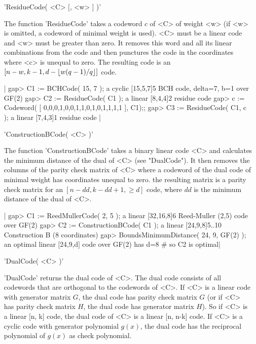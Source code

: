 
'ResidueCode( <C> [, <w> ] )'

The function 'ResidueCode' takes a codeword $c$  of <C> of weight <w> (if
<w> is  omitted, a codeword  of minimal weight is  used).  <C> must  be a
linear code and <w>  must be greater than zero.  It removes this word and
all its linear combinations from the code and then  punctures the code in
the coordinates where <c> is unequal  to zero.  The  resulting code is an
$[n-w, k-1, d-\lfloor w\*(q-1)/q \rfloor ]$ code.

|    gap> C1 := BCHCode( 15, 7 );
    a cyclic [15,5,7]5 BCH code, delta=7, b=1 over GF(2)
    gap> C2 := ResidueCode( C1 );
    a linear [8,4,4]2 residue code
    gap> c := Codeword( [ 0,0,0,1,0,0,1,1,0,1,0,1,1,1,1 ], C1);;
    gap> C3 := ResidueCode( C1, c );
    a linear [7,4,3]1 residue code |


'ConstructionBCode( <C> )'

The function  'ConstructionBCode' takes  a   binary linear code   <C> and
calculates the minimum  distance of the dual  of <C> (see "DualCode"). It
then  removes the  columns  of the  parity  check  matrix of <C>  where a
codeword of  the dual code of minimal  weight  has coordinates unequal to
zero. the resulting matrix   is a  parity  check  matrix for   an $[n-dd,
k-dd+1, \geq d]$ code, where $dd$ is the minimum distance  of the dual of
<C>.

|    gap> C1 := ReedMullerCode( 2, 5 );
    a linear [32,16,8]6 Reed-Muller (2,5) code over GF(2)
    gap> C2 := ConstructionBCode( C1 );
    a linear [24,9,8]5..10 Construction B (8 coordinates)
    gap> BoundsMinimumDistance( 24, 9, GF(2) );
    an optimal linear [24,9,d] code over GF(2) has d=8  # so C2 is optimal|


'DualCode( <C> )'

'DualCode' returns the  dual code of  <C>. The dual  code consists of all
codewords that are orthogonal to the codewords of <C>. If <C> is a linear
code with generator matrix $G$, the dual code has parity check matrix $G$
(or  if  <C> has  parity  check matrix $H$,  the  dual code has generator
matrix $H$). So if <C> is a linear [n, k] code, the dual code of <C> is a
linear [n,  n-k] code. If <C> is  a cyclic code with generator polynomial
$g(x)$, the dual code  has the reciprocal  polynomial of $g(x)$ as  check
polynomial.

